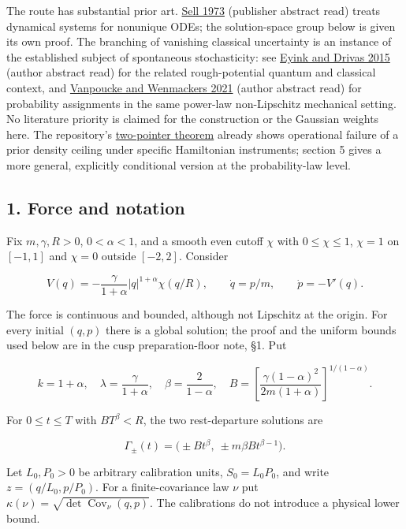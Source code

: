 \documentclass[11pt,a4paper]{article}
\begin{document}
The route has substantial prior art.
\href{https://doi.org/10.1016/0022-0396(73)90075-2}{Sell 1973}
(publisher abstract read) treats dynamical systems for nonunique ODEs;
the solution-space group below is given its own proof. The branching of
vanishing classical uncertainty is an instance of the established
subject of spontaneous stochasticity: see
\href{https://arxiv.org/abs/1509.04941}{Eyink and Drivas 2015} (author
abstract read) for the related rough-potential quantum and classical
context, and \href{https://doi.org/10.1063/5.0063388}{Vanpoucke and
Wenmackers 2021} (author abstract read) for probability assignments in
the same power-law non-Lipschitz mechanical setting. No literature
priority is claimed for the construction or the Gaussian weights here.
The repository's
\href{necessity-unit-and-indeterminacy.md\#3-theorem-i-the-two-pointer-construction}{two-pointer
theorem} already shows operational failure of a prior density ceiling
under specific Hamiltonian instruments; section 5 gives a more general,
explicitly conditional version at the probability-law level.

\hypertarget{force-and-notation}{%
\subsection{1. Force and notation}\label{force-and-notation}}

Fix \(m,\gamma,R>0\), \(0<\alpha<1\), and a smooth even cutoff \(\chi\)
with \(0\le\chi\le1\), \(\chi=1\) on \([-1,1]\) and \(\chi=0\) outside
\([-2,2]\). Consider

\[
 V(q)=-\frac{\gamma}{1+\alpha}|q|^{1+\alpha}\chi(q/R),\qquad
 \dot q=p/m,\qquad \dot p=-V'(q). \tag{1}
\]

The force is continuous and bounded, although not Lipschitz at the
origin. For every initial \((q,p)\) there is a global solution; the
proof and the uniform bounds used below are in the cusp
preparation-floor note, §1. Put

\[
 k=1+\alpha,\quad \lambda=\frac{\gamma}{1+\alpha},\quad
 \beta=\frac{2}{1-\alpha},\quad
 B=\left[\frac{\gamma(1-\alpha)^2}{2m(1+\alpha)}\right]^{1/(1-\alpha)}.
 \tag{2}
\]

For \(0\le t\le T\) with \(BT^\beta<R\), the two rest-departure
solutions are

\[
 \Gamma_\pm(t)=\bigl(\pm Bt^\beta,\ \pm m\beta B t^{\beta-1}\bigr).
 \tag{3}
\]

Let \(L_0,P_0>0\) be arbitrary calibration units, \(S_0=L_0P_0\), and
write \(z=(q/L_0,p/P_0)\). For a finite-covariance law \(\nu\) put
\(\kappa(\nu)=\sqrt{\det\operatorname{Cov}_\nu(q,p)}\). The calibrations
do not introduce a physical lower bound.
\end{document}
